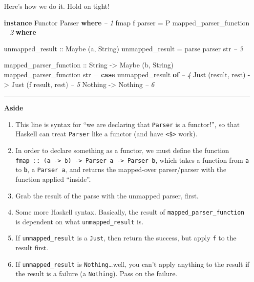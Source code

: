\documentclass[]{article}
\newenvironment{Shaded}{}{}
\newcommand{\KeywordTok}[1]{\textcolor[rgb]{0.00,0.44,0.13}{\textbf{{#1}}}}
\newcommand{\DataTypeTok}[1]{\textcolor[rgb]{0.56,0.13,0.00}{{#1}}}
\newcommand{\CommentTok}[1]{\textcolor[rgb]{0.38,0.63,0.69}{\textit{{#1}}}}
\newcommand{\OtherTok}[1]{\textcolor[rgb]{0.00,0.44,0.13}{{#1}}}
\newcommand{\FunctionTok}[1]{\textcolor[rgb]{0.02,0.16,0.49}{{#1}}}
\newcommand{\NormalTok}[1]{{#1}}
\begin{document}
Here's how we do it. Hold on tight!

\begin{Shaded}
\begin{Highlighting}[]
\KeywordTok{instance} \DataTypeTok{Functor} \DataTypeTok{Parser} \KeywordTok{where}                                       \CommentTok{-- 1}
    \NormalTok{fmap f parser }\FunctionTok{=} \DataTypeTok{P} \NormalTok{mapped_parser_function                        }\CommentTok{-- 2}
        \KeywordTok{where}

\OtherTok{            unmapped_result ::} \DataTypeTok{Maybe} \NormalTok{(a, }\DataTypeTok{String}\NormalTok{)}
            \NormalTok{unmapped_result }\FunctionTok{=} \NormalTok{parse parser str                      }\CommentTok{-- 3}

\OtherTok{            mapped_parser_function ::} \DataTypeTok{String} \OtherTok{->} \DataTypeTok{Maybe} \NormalTok{(b, }\DataTypeTok{String}\NormalTok{)}
            \NormalTok{mapped_parser_function str }\FunctionTok{=}
                \KeywordTok{case} \NormalTok{unmapped_result }\KeywordTok{of}                             \CommentTok{-- 4}
                    \DataTypeTok{Just} \NormalTok{(result, rest) }\OtherTok{->} \DataTypeTok{Just} \NormalTok{(f result, rest)    }\CommentTok{-- 5}
                    \DataTypeTok{Nothing}             \OtherTok{->} \DataTypeTok{Nothing}                  \CommentTok{-- 6}
\end{Highlighting}
\end{Shaded}

\begin{center}\rule{0.5\linewidth}{\linethickness}\end{center}

\textbf{Aside}

\begin{enumerate}
\def\labelenumi{\arabic{enumi}.}
\tightlist
\item
  This line is syntax for ``we are declaring that \texttt{Parser} is a
  functor!'', so that Haskell can treat \texttt{Parser} like a functor
  (and have \texttt{\textless{}\$\textgreater{}} work).
\item
  In order to declare something as a functor, we must define the
  function
  \texttt{fmap\ ::\ (a\ -\textgreater{}\ b)\ -\textgreater{}\ Parser\ a\ -\textgreater{}\ Parser\ b},
  which takes a function from \texttt{a} to \texttt{b}, a
  \texttt{Parser\ a}, and returns the mapped-over parser/parser with the
  function applied ``inside''.
\item
  Grab the result of the parse with the unmapped parser, first.
\item
  Some more Haskell syntax. Basically, the result of
  \texttt{mapped\_parser\_function} is dependent on what
  \texttt{unmapped\_result} is.
\item
  If \texttt{unmapped\_result} is a \texttt{Just}, then return the
  success, but apply \texttt{f} to the result first.
\item
  If \texttt{unmapped\_result} is \texttt{Nothing}\ldots{}well, you
  can't apply anything to the result if the result is a failure (a
  \texttt{Nothing}). Pass on the failure.
\end{enumerate}
\end{document}
